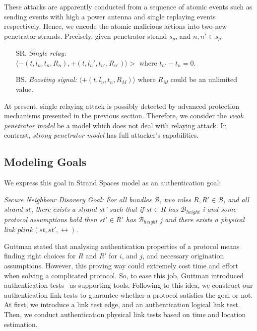 These attacks are apparently conducted from a sequence of atomic events such as sending events with high a power antenna  and single replaying events respectively. Hence, we encode the atomic malicious actions into two new penetrator strands. Precisely, given penetrator strand $s_p$, and $n, n' \in s_p$. 
\begin{itemize}
\item[SR.] \emph{Single relay:} \\ $\langle -(t, l_n, t_n, R_n), +(t, l_n', t_{n'}, R_{n'}) \rangle >$ where $t_{n'} - t_n = 0$.
\item [BS.] \emph{Boosting signal:} $\langle +(t, l_n, t_n, R_M) \rangle$ where $R_M$ could be an unlimited value. 
\end{itemize}

At present, single relaying attack is possibly detected by advanced protection mechanisms presented in the previous section. Therefore, we consider the \emph{weak penetrator model} be a model which does not deal with relaying attack. In contrast, \emph{strong penetrator model} has full attacker's capabilities. 

\subsection{Modeling Goals}

We express this goal in Strand Spaces model as an authentication goal:

\emph{Secure Neighbour Disovery Goal:} \textit{For all bundles $\mathcal{B}$, two roles $R, R' \in \mathcal{B}$, and all strand $st$, there exists a strand $st$' such that if $st \in R$ has $ \mathcal{B}_{height}$ i and some protocol assumptions hold then $st' \in R'$ has $\mathcal{B}_{height}$ j and there exists a physical link $plink(st,st',\leftrightarrow)$.}

Guttman stated that analysing authentication properties of a protocol means finding right choices for $R$ and $R'$ for $i$, and $j$, and necessary origination assumptions. However, this proving way could extremely cost time and effort when solving a complicated protocol. So, to ease this job, Guttman introduced authentication tests~\cite{authenticationtests} as supporting tools. Following to this idea, we construct our authentication link tests to guarantee whether a protocol satisfies the goal or not.  At first, we introduce a link test edge, and an authentication logical link test. Then, we conduct authentication physical link tests based on time and location estimation. 

